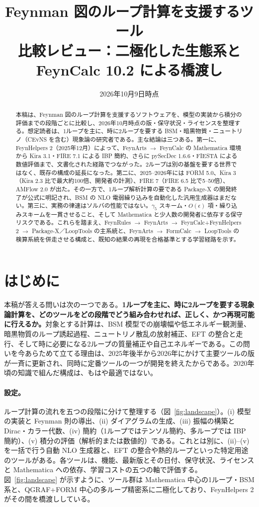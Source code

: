 \documentclass[a4paper,10pt]{ltjsarticle}
\title{Feynman 図のループ計算を支援するツール\\[2pt]{\large 比較レビュー：二極化した生態系と FeynCalc 10.2 による橋渡し}}
\author{}
\date{2026年10月9日時点}
\begin{document}
\maketitle

\begin{abstract}
本稿は、Feynman 図のループ計算を支援するソフトウェアを、模型の実装から積分の評価までの段階ごとに比較し、2026年10月時点の版・保守状況・ライセンスを整理する。想定読者は、1ループを主に、時に2ループを要する BSM・暗黒物質・ニュートリノ（CEvNS を含む）現象論の研究者である。主な結論は三つある。第一に、FeynHelpers 2（2025年12月）によって、FeynArts $\to$ FeynCalc の Mathematica 環境から Kira 3.1・FIRE 7.1 による IBP 簡約、さらに pySecDec 1.6.6・FIESTA による数値評価まで、文書化された経路でつながった。2ループは別の基盤を要する世界ではなく、既存の構成の延長になった。第二に、2025--2026年には FORM 5.0、Kira 3（Kira 2.3 比で最大約100倍、開発者の計測）、FIRE 7（FIRE 6.5 比で5--50倍）、AMFlow 2.0 が出た。その一方で、1ループ解析計算の要である Package-X の開発終了が公式に明記され、BSM の NLO 電弱繰り込みを自動化した汎用生成器はまだない。第三に、実務の律速はソルバの性能ではない。$\gamma_5$ スキーム・$O(\epsilon)$ 項・繰り込みスキームを一貫させること、そして Mathematica と少人数の開発者に依存する保守リスクである。これらを踏まえ、FeynRules $\to$ FeynArts $\to$ FeynCalc+FeynHelpers 2 $\to$ Package-X／LoopTools の主系統と、FeynArts $\to$ FormCalc $\to$ LoopTools の検算系統を併走させる構成と、既知の結果の再現を合格基準とする学習経路を示す。
\end{abstract}

\section{はじめに}

本稿が答える問いは次の一つである。\textbf{1ループを主に、時に2ループを要する現象論計算を、どのツールをどの段階でどう組み合わせれば、正しく、かつ再現可能に行えるか。}対象とする計算は、BSM 模型での崩壊幅や低エネルギー観測量、暗黒物質のループ誘起過程、ニュートリノ散乱の放射補正、EFT の整合と走行、そして時に必要になる2ループの質量補正や自己エネルギーである。この問いを今あらためて立てる理由は、2025年後半から2026年にかけて主要ツールの版が一斉に更新され、同時に定番ツールの一つが開発を終えたからである。2020年頃の知識で組んだ構成は、もはや最適ではない。

\paragraph{設定。}ループ計算の流れを五つの段階に分けて整理する（図~\ref{fig:landscape}）。(i) 模型の実装と Feynman 則の導出、(ii) ダイアグラムの生成、(iii) 振幅の構築と Dirac・カラー代数、(iv) 簡約（1ループではテンソル簡約、多ループでは IBP 簡約）、(v) 積分の評価（解析的または数値的）である。これとは別に、(ii)--(v) を一括で行う自動 NLO 生成器と、EFT の整合や熱的ループといった特定用途のツールがある。各ツールは、機能、最新版とその日付、保守状況、ライセンスと Mathematica への依存、学習コストの五つの軸で評価する。図~\ref{fig:landscape} が示すように、ツール群は Mathematica 中心の1ループ・BSM 系と、QGRAF+FORM 中心の多ループ精密系に二極化しており、FeynHelpers 2 がその間を橋渡ししている。
\end{document}

